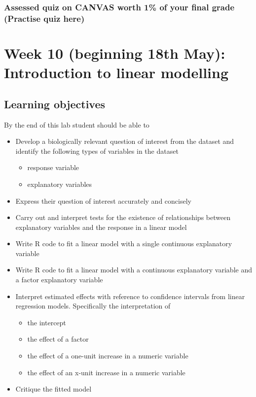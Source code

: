 \documentclass{article}
\begin{document}
\subsubsection*{Assessed quiz on CANVAS worth 1\% of your final grade (Practise quiz here)}



\newpage

\section*{Week 10 (beginning 18th May): Introduction to linear modelling}
\subsection*{Learning objectives}
By the end of this lab student should be able to
\begin{itemize}
\item Develop a biologically relevant question of interest  from the dataset and identify the following types of variables in the dataset
  \begin{itemize}
  \item response variable
  \item explanatory variables
  \end{itemize}
\item Express their question of interest accurately and concisely
\item Carry out and interpret tests for the existence of relationships between explanatory variables and the response in a linear model
\item Write R code to fit a linear model with a single continuous explanatory variable
\item Write R code to fit a linear model with a continuous explanatory variable and a factor explanatory variable
\item Interpret estimated effects with reference to confidence intervals from linear regression models. Specifically the interpretation of
  \begin{itemize}
  \item the intercept
  \item the effect of a factor
  \item the effect of a one-unit increase in a numeric variable
  \item the effect of an x-unit increase in a numeric variable
  \end{itemize}
\item Critique the fitted model
\end{itemize}
\end{document}
